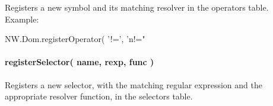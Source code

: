 Registers a new symbol and its matching resolver in the operators table. Example\+:


\begin{DoxyCode}
NW.Dom.registerOperator( '!=', 'n!="%
\end{DoxyCode}


\paragraph*{{\ttfamily register\+Selector( name, rexp, func )}}

Registers a new selector, with the matching regular expression and the appropriate resolver function, in the selectors table. 